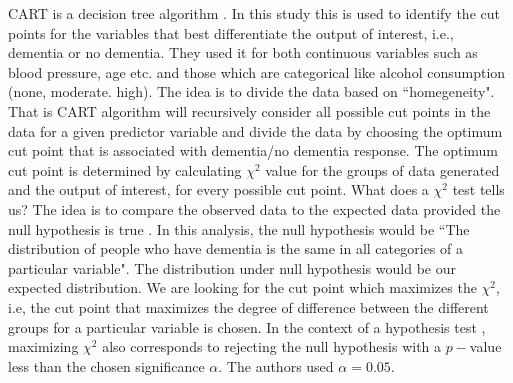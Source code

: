 \documentclass[12pt,letterpaper]{article}
\begin{document}
CART is a decision tree algorithm \cite{cart1,cart2,cart3,cart4}. In this study this is used to identify the cut points for the variables that best differentiate the output of interest, i.e., dementia or no dementia. They used it for both continuous variables such as blood pressure, age etc. and those which are categorical like alcohol consumption (none, moderate. high). The idea is to divide the data based on ``homegeneity". That is CART algorithm will recursively consider all possible cut points in the data for a given predictor variable and divide the data by choosing the optimum cut point that is associated with dementia/no dementia response. The optimum cut point is determined by calculating $\chi^2$ value for the groups of data generated and the output of interest, for every possible cut point. What does a $\chi^2$ test tells us? The idea is to compare the observed data to the expected data provided the null hypothesis is true \cite{intro2013, chisq}. In this analysis, the null hypothesis would be ``The distribution of people who have dementia is the same in all categories of a particular variable". The distribution under null hypothesis would be our expected distribution. We are looking for the cut point which maximizes the $\chi^2$, i.e, the cut point that maximizes the degree of difference between the different groups for a particular variable is chosen. In the context of a  hypothesis test \cite{intro2013}, maximizing $\chi^2$ also corresponds to rejecting the null hypothesis with a $p-$value less than the chosen significance $\alpha$. The authors used $\alpha=0.05$. \\
\end{document}
